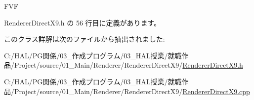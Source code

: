 F\+VF 



 Renderer\+Direct\+X9.\+h の 56 行目に定義があります。



このクラス詳解は次のファイルから抽出されました\+:\begin{DoxyCompactItemize}
\item 
C\+:/\+H\+A\+L/\+P\+G関係/03\+\_\+作成プログラム/03\+\_\+\+H\+A\+L授業/就職作品/\+Project/source/01\+\_\+\+Main/\+Renderer/\+Renderer\+Direct\+X9/\mbox{\hyperlink{_renderer_direct_x9_8h}{Renderer\+Direct\+X9.\+h}}\item 
C\+:/\+H\+A\+L/\+P\+G関係/03\+\_\+作成プログラム/03\+\_\+\+H\+A\+L授業/就職作品/\+Project/source/01\+\_\+\+Main/\+Renderer/\+Renderer\+Direct\+X9/\mbox{\hyperlink{_renderer_direct_x9_8cpp}{Renderer\+Direct\+X9.\+cpp}}\end{DoxyCompactItemize}
